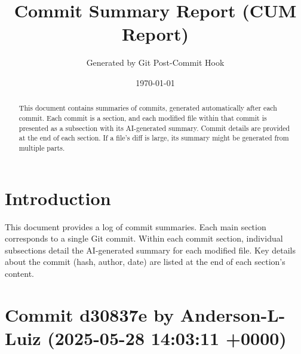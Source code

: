 \documentclass{article}
\title{Commit Summary Report (CUM Report)}
\author{Generated by Git Post-Commit Hook}
\date{\today}
\begin{document}
\maketitle
\begin{abstract}
This document contains summaries of commits, generated automatically after each commit. Each commit is a section, and each modified file within that commit is presented as a subsection with its AI-generated summary. Commit details are provided at the end of each section. If a file's diff is large, its summary might be generated from multiple parts.
\end{abstract}
\tableofcontents
\newpage

\section{Introduction}
This document provides a log of commit summaries. Each main section corresponds to a single Git commit. Within each commit section, individual subsections detail the AI-generated summary for each modified file. Key details about the commit (hash, author, date) are listed at the end of each section's content.
\section{Commit d30837e by Anderson-L-Luiz (2025-05-28 14:03:11 +0000)}
\end{document}
